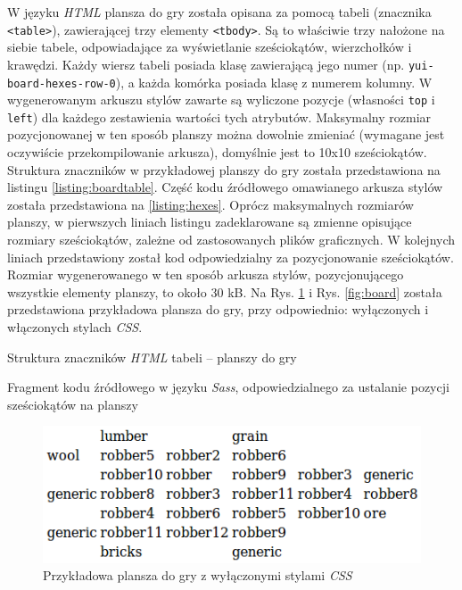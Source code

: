 \documentclass[a4paper,12pt]{article}
\providecommand{\imref}[1]{Rys. \ref{#1}} %
\begin{document}
W języku \emph{HTML} plansza do gry została opisana za pomocą tabeli
(znacznika \texttt{<table>}), zawierającej trzy elementy
\texttt{<tbody>}. Są to właściwie trzy nałożone na siebie tabele,
odpowiadające za wyświetlanie sześciokątów, wierzchołków i
krawędzi. Każdy wiersz tabeli posiada klasę zawierającą jego numer
(np. \texttt{yui-board-hexes-row-0}), a każda komórka posiada klasę z
numerem kolumny. W wygenerowanym arkuszu stylów zawarte są wyliczone
pozycje (własności \texttt{top} i \texttt{left}) dla każdego
zestawienia wartości tych atrybutów. Maksymalny rozmiar pozycjonowanej
w ten sposób planszy można dowolnie zmieniać (wymagane jest oczywiście
przekompilowanie arkusza), domyślnie jest to 10x10
sześciokątów. Struktura znaczników w przykładowej planszy do gry
została przedstawiona na listingu \ref{listing:boardtable}. Część kodu
źródłowego omawianego arkusza stylów została przedstawiona na
\ref{listing:hexes}. Oprócz maksymalnych rozmiarów planszy, w
pierwszych liniach listingu zadeklarowane są zmienne opisujące
rozmiary sześciokątów, zależne od zastosowanych plików graficznych. W
kolejnych liniach przedstawiony został kod odpowiedzialny za
pozycjonowanie sześciokątów. Rozmiar wygenerowanego w ten sposób
arkusza stylów, pozycjonującego wszystkie elementy planszy, to około
30 kB. Na \imref{fig:boardunstyled} i \imref{fig:board} została
przedstawiona przykładowa plansza do gry, przy odpowiednio:
wyłączonych i włączonych stylach \emph{CSS}.

\begin{listing}
  
  \caption{Struktura znaczników \emph{HTML} tabeli -- planszy do gry}
  \label{listing:boardtable}
\end{listing}

\begin{listing}
  
  \caption{Fragment kodu źródłowego w języku \emph{Sass},
    odpowiedzialnego za ustalanie pozycji sześciokątów na planszy}
  \label{listing:hexes}
\end{listing}

\begin{figure}[ht]
  \begin{center}
    \includegraphics[width=\linewidth]{boardunstyled.png}
  \end{center}
  \caption{Przykładowa plansza do gry z wyłączonymi stylami
    \emph{CSS}}
  \label{fig:boardunstyled}
\end{figure}
\end{document}
